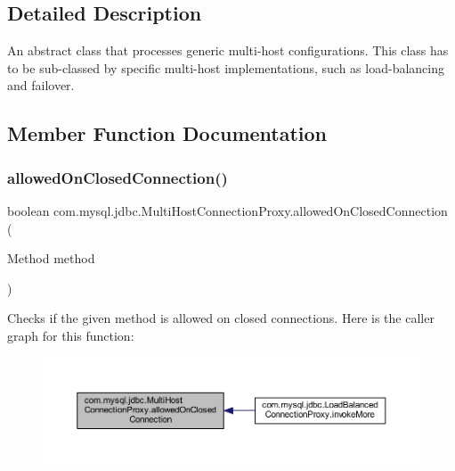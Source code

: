 \subsection{Detailed Description}
An abstract class that processes generic multi-\/host configurations. This class has to be sub-\/classed by specific multi-\/host implementations, such as load-\/balancing and failover. 

\subsection{Member Function Documentation}
\mbox{\label{classcom_1_1mysql_1_1jdbc_1_1_multi_host_connection_proxy_a799290722b93bd37d82f4b1364fa4975}} 
\subsubsection{\texorpdfstring{allowed\+On\+Closed\+Connection()}{allowedOnClosedConnection()}}
{\footnotesize\ttfamily boolean com.\+mysql.\+jdbc.\+Multi\+Host\+Connection\+Proxy.\+allowed\+On\+Closed\+Connection (\begin{DoxyParamCaption}\item[{Method}]{method }\end{DoxyParamCaption})\hspace{0.3cm}{\ttfamily [protected]}}

Checks if the given method is allowed on closed connections. Here is the caller graph for this function\+:
\nopagebreak
\begin{figure}[H]
\begin{center}
\leavevmode
\includegraphics[width=350pt]{classcom_1_1mysql_1_1jdbc_1_1_multi_host_connection_proxy_a799290722b93bd37d82f4b1364fa4975_icgraph}
\end{center}
\end{figure}
\mbox{\label{classcom_1_1mysql_1_1jdbc_1_1_multi_host_connection_proxy_ad1a32008ee8fe87595d5f04667f8850e}} 
